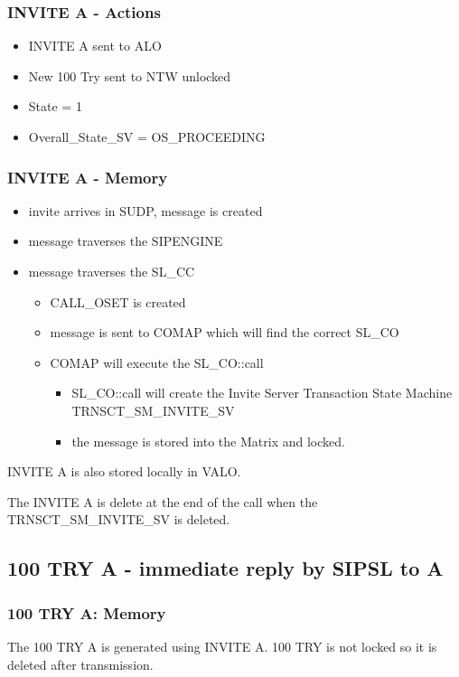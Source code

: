 \documentclass[a4paper]{article}
\begin{document}
\subsubsection{INVITE A - Actions}
\begin {itemize}
\item INVITE A sent to ALO
\item New 100 Try sent to NTW unlocked
\item State = 1
\item Overall\_State\_SV = OS\_PROCEEDING
\end{itemize}

\subsubsection{INVITE A - Memory}

\begin {itemize}
\item invite arrives in SUDP, message is created
\item message traverses the SIPENGINE
\item message traverses the SL\_CC
\begin {itemize}
\item CALL\_OSET is created
\item message is sent to COMAP which will find the correct SL\_CO
\item COMAP will execute the SL\_CO::call
\begin {itemize}
\item SL\_CO::call will create the Invite Server Transaction State Machine TRNSCT\_SM\_INVITE\_SV
\item the message is stored into the Matrix and locked.
\end{itemize}
\end{itemize}
\end{itemize}

INVITE A is also stored locally in VALO.

The INVITE A is delete at the end of the call when the TRNSCT\_SM\_INVITE\_SV is deleted.

\subsection{100 TRY A - immediate reply by SIPSL to A}

\subsubsection{100 TRY A: Memory}
The 100 TRY A is generated using INVITE A. 100 TRY is not locked so it is deleted after transmission.
\end{document}
